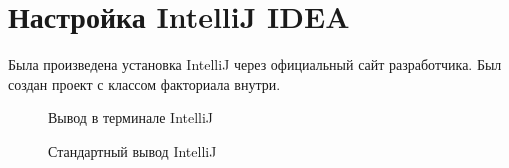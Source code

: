 \documentclass[a4paper, 14pt]{extarticle}
\begin{document}
\section{Настройка IntelliJ IDEA}
Была произведена установка IntelliJ через официальный сайт разработчика. Был создан проект с классом факториала внутри.
\begin{figure}[h] 
\caption{Вывод в терминале IntelliJ} 
\label{fig:image} 
\end{figure}
\begin{figure}[h] 
\caption{Стандартный вывод IntelliJ} 
\label{fig:image} 
\end{figure}
\end{document}
